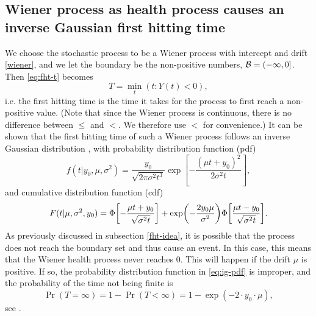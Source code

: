 \subsection{Wiener process as health process causes an inverse Gaussian first hitting time}
We choose the stochastic process to be a Wiener process with intercept and drift \eqref{wiener}, and we let the boundary be the non-positive numbers, $\mathcal{B}=(-\infty,0]$.
Then \eqref{eq:fht-t} becomes
\begin{equation*}
    T=\min_t\left(t\colon Y(t)<0\right),
\end{equation*}
i.e. the first hitting time is the time it takes for the process to first reach a non-positive value.
(Note that since the Wiener process is continuous, there is no difference between $\leq$ and $<$. We therefore use $<$ for convenience.)
It can be shown that the first hitting time of such a Wiener process follows an inverse Gaussian distribution \citep{chhikara1988}, with probability distribution function (pdf)
\begin{equation}
\label{eq:ig-pdf}
    f(t|y_0,\mu,\sigma^2)=\frac{y_0}{\sqrt{2\pi\sigma^2t^3}}\exp\left[-\frac{(\mu t+y_0)^2}{2\sigma^2t}\right],
\end{equation}
and cumulative distribution function (cdf)
\begin{equation}
\label{eq:ig-cdf}
    F(t|\mu,\sigma^2,y_0)=\Phi\sqb*{-\frac{\mu t+y_0}{\sqrt{\sigma^2t}}}+\exp\p*{-\frac{2y_0\mu}{\sigma^2}}\Phi\sqb*{\frac{\mu t-y_0}{\sqrt{\sigma^2t}}}.
\end{equation}
As previously discussed in subsection \ref{fht-idea}, it is possible that the process does not reach the boundary set and thus cause an event.
In this case, this means that the Wiener health process never reaches 0.
This will happen if the drift $\mu$ is positive.
If so, the probability distribution function in \eqref{eq:ig-pdf} is improper, and the probability of the time not being finite is
\begin{equation}\label{eq:P-inf-FHT}
    \Pr{(T=\infty)}=1-\Pr{(T<\infty)}=1-\exp{(-2\cdot y_0\cdot\mu)},
\end{equation}
see \citet{cox1965}.

